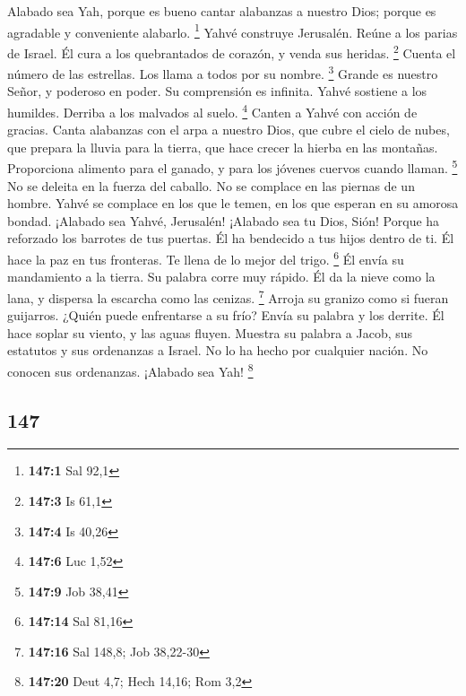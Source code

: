 \begin{paracol}{2}
 Alabado sea Yah, porque es bueno cantar alabanzas a
nuestro Dios; porque es agradable y conveniente alabarlo. \footnote{\textbf{147:1}
  Sal 92,1}  Yahvé construye Jerusalén. Reúne a los parias
de Israel.  Él cura a los quebrantados de corazón, y venda
sus heridas. \footnote{\textbf{147:3} Is 61,1}  Cuenta el
número de las estrellas. Los llama a todos por su nombre. \footnote{\textbf{147:4}
  Is 40,26}  Grande es nuestro Señor, y poderoso en poder.
Su comprensión es infinita.  Yahvé sostiene a los
humildes. Derriba a los malvados al suelo. \footnote{\textbf{147:6} Luc
  1,52}  Canten a Yahvé con acción de gracias. Canta
alabanzas con el arpa a nuestro Dios,  que cubre el cielo
de nubes, que prepara la lluvia para la tierra, que hace crecer la
hierba en las montañas.  Proporciona alimento para el
ganado, y para los jóvenes cuervos cuando llaman. \footnote{\textbf{147:9}
  Job 38,41}  No se deleita en la fuerza del caballo. No
se complace en las piernas de un hombre.  Yahvé se
complace en los que le temen, en los que esperan en su amorosa bondad.
 ¡Alabado sea Yahvé, Jerusalén! ¡Alabado sea tu Dios,
Sión!  Porque ha reforzado los barrotes de tus puertas.
Él ha bendecido a tus hijos dentro de ti.  Él hace la paz
en tus fronteras. Te llena de lo mejor del trigo. \footnote{\textbf{147:14}
  Sal 81,16}  Él envía su mandamiento a la tierra. Su
palabra corre muy rápido.  Él da la nieve como la lana, y
dispersa la escarcha como las cenizas. \footnote{\textbf{147:16} Sal
  148,8; Job 38,22-30}  Arroja su granizo como si fueran
guijarros. ¿Quién puede enfrentarse a su frío?  Envía su
palabra y los derrite. Él hace soplar su viento, y las aguas fluyen.
 Muestra su palabra a Jacob, sus estatutos y sus
ordenanzas a Israel.  No lo ha hecho por cualquier
nación. No conocen sus ordenanzas. ¡Alabado sea Yah! \footnote{\textbf{147:20}
  Deut 4,7; Hech 14,16; Rom 3,2}

\switchcolumn
\begin{otherlanguage}{english}

\hypertarget{section-293}{%
\section{147}\label{section-293}}


\end{otherlanguage}
\end{paracol}
